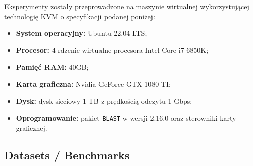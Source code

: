 \documentclass{article}
\newcommand{\temporary}[1]{
    \begin{tcolorbox}[colframe=red, colback=white, title={\textbf{WERSJA PO POLSKU}}, sharp corners=south]
        #1
    \end{tcolorbox}
}
\begin{document}
            \temporary{
                Eksperymenty zostały przeprowadzone na maszynie wirtualnej wykorzystującej technologię KVM o specyfikacji podanej poniżej:

        
                    \begin{itemize}
                        \item {
                            \textbf{System operacyjny:} Ubuntu 22.04 LTS;
                        }
                        \item {
                            \textbf{Procesor:} 4 rdzenie wirtualne procesora Intel Core i7-6850K;
                        }
                        \item {
                            \textbf{Pamięć RAM:} 40GB;
                        }
                        \item {
                            \textbf{Karta graficzna:} Nvidia GeForce GTX 1080 TI;
                        }
                        \item {
                            \textbf{Dysk:} dysk sieciowy 1 TB z prędkością odczytu 1 Gbps;
                        }
                        \item {
                            \textbf{Oprogramowanie:} pakiet \texttt{BLAST} w wersji 2.16.0 oraz sterowniki karty graficznej.
                        }
                    \end{itemize}
            }

        \subsection{Datasets / Benchmarks}
\end{document}
